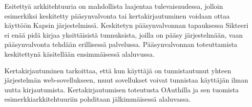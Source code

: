 Esitettyä arkkitehtuuria on mahdollista laajentaa tulevaisuudessa, jolloin esimerkiksi keskitetty pääsynvalvonta tai kertakirjautuminen voidaan ottaa käyttöön Kapsin järjestelmissä. Keskitetyn pääsynvalvonnan tapauksessa Sikteeri ei enää pidä kirjaa yksittäisistä tunnuksista, joilla on pääsy järjestelmään, vaan pääsynvalvonta tehdään erillisessä palvelussa. Pääsynvalvonnan toteuttamista keskitettynä käsitellään ensimmäisessä alaluvussa.

Kertakirjautuminen tarkoittaa, että kun käyttäjä on tunnistautunut yhteen järjestelmän web-sovellukseen, muut sovellukset voivat tunnistaa käyttäjän ilman uutta kirjautumista. Kertakirjautumisen toteutusta OAuthilla ja sen tuomista esimerkkiarkkitehtuuriin pohditaan jälkimmäisessä alaluvassa.